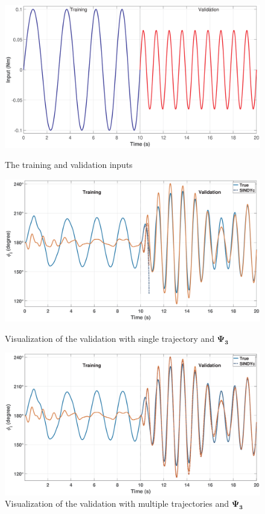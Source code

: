 \begin{figure}[H]
    \centering
    \includegraphics[width=0.85\linewidth]{figures/Input}
    \caption{The training and validation inputs}
    \label{fig: inputTrainVal}
\vspace{0.005em}
    \centering
    \includegraphics[width=0.85\linewidth]{figures/VizSingleTrajVal_2_0_1}
    \caption{Visualization of the validation with single trajectory and $\mathbf{\Psi_3}$}
    \label{fig: SingleTrajValCombo}
\vspace{0.005em}
    \centering
    \includegraphics[width=0.85\linewidth]{figures/VizMultTrajVal_2_0_1}
    \caption{Visualization of the validation with multiple trajectories and $\mathbf{\Psi_3}$}
    \label{fig: MultTrajValCombo}
\end{figure}
